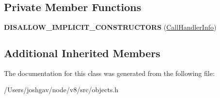 \subsection*{Private Member Functions}
\begin{DoxyCompactItemize}
\item 
{\bfseries D\+I\+S\+A\+L\+L\+O\+W\+\_\+\+I\+M\+P\+L\+I\+C\+I\+T\+\_\+\+C\+O\+N\+S\+T\+R\+U\+C\+T\+O\+RS} (\hyperlink{classv8_1_1internal_1_1_call_handler_info}{Call\+Handler\+Info})\hypertarget{classv8_1_1internal_1_1_call_handler_info_a13898d0ce821bed4d51dbc42157689ff}{}\label{classv8_1_1internal_1_1_call_handler_info_a13898d0ce821bed4d51dbc42157689ff}

\end{DoxyCompactItemize}
\subsection*{Additional Inherited Members}


The documentation for this class was generated from the following file\+:\begin{DoxyCompactItemize}
\item 
/\+Users/joshgav/node/v8/src/objects.\+h\end{DoxyCompactItemize}
